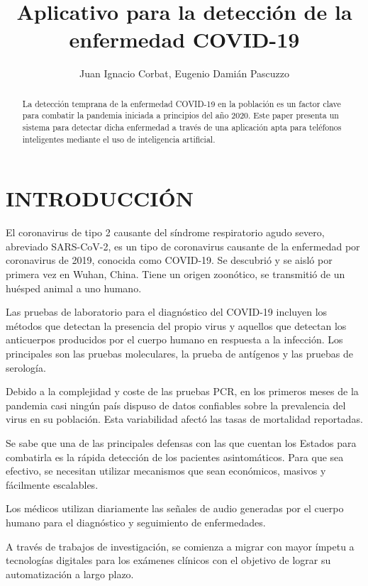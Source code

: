 \documentclass[journal]{IEEEtran}
\title{Aplicativo para la detección de la enfermedad COVID-19}
\author{Juan Ignacio Corbat, Eugenio Damián Pascuzzo}
\begin{document}
\maketitle

\begin{abstract}
La detección temprana de la enfermedad COVID-19 en la población es un factor clave para combatir la pandemia iniciada a principios del año 2020. Este paper presenta un sistema para detectar dicha enfermedad a través de una aplicación apta para teléfonos inteligentes mediante el uso de inteligencia artificial.
\end{abstract}

\section{INTRODUCCIÓN}
El coronavirus de tipo 2 causante del síndrome respiratorio agudo severo, abreviado SARS-CoV-2, es un tipo de coronavirus causante de la enfermedad por coronavirus de 2019, conocida como COVID-19. Se descubrió y se aisló por primera vez en Wuhan, China. Tiene un origen zoonótico, se transmitió de un huésped animal a uno humano\cite{covid-19-definición}.

Las pruebas de laboratorio para el diagnóstico del COVID-19 incluyen los métodos que detectan la presencia del propio virus y aquellos que detectan los anticuerpos producidos por el cuerpo humano en respuesta a la infección. Los principales son las pruebas moleculares, la prueba de antígenos y las pruebas de serología.

Debido a la complejidad y coste de las pruebas PCR, en los primeros meses de la pandemia casi ningún país dispuso de datos confiables sobre la prevalencia del virus en su población. Esta variabilidad afectó las tasas de mortalidad reportadas\cite{covid-19-overview}.

Se sabe que una de las principales defensas con las que cuentan los Estados para combatirla es la rápida detección de los pacientes asintomáticos. Para que sea efectivo, se necesitan utilizar mecanismos que sean económicos, masivos y fácilmente escalables.

Los médicos utilizan diariamente las señales de audio generadas por el cuerpo humano para el diagnóstico y seguimiento de enfermedades.

A través de trabajos de investigación, se comienza a migrar con mayor ímpetu a tecnologías digitales para los exámenes clínicos con el objetivo de lograr su automatización a largo plazo.
\end{document}

